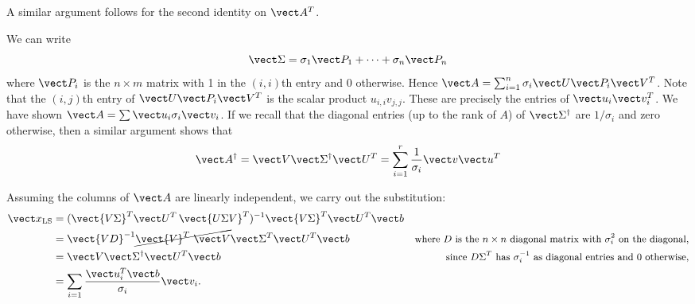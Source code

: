\documentclass{homework}
\begin{document}
\begin{longproblem}
\begin{solution}
    A similar argument follows for the second identity on $\vect A^T$.
  \end{solution}

  \begin{solution}
    We can write
    $$
      \vect\Sigma = \sigma_1 \vect P_1 + \dots + \sigma_n \vect P_n
    $$
    where $\vect P_i$ is the $n\times m$ matrix with 1 in the $(i,i)$th entry and 0 otherwise.  Hence $\vect A = \sum_{i=1}^n\sigma_i\vect U\vect P_i \vect V^T$. Note that the $(i,j)$th entry of 
    $\vect U\vect P_i\vect V^T$ is the scalar product $u_{i,i} v_{j,j}$.  These are precisely the entries of $\vect u_i \vect v_i^T$. We have shown $\vect A = \sum \vect u_i \sigma_i \vect v_i$.  If we recall that the diagonal entries (up to the rank of $A$) of $\vect \Sigma^\dagger$ are $1/\sigma_i$ and zero otherwise, then a similar argument shows that
    $$
      \vect A^\dagger = \vect V \vect \Sigma^\dagger \vect U^T = \sum_{i=1}^{r} \frac 1{\sigma_i}\vect v \vect u^T
    $$
  \end{solution}

\end{longproblem}
\begin{solution}
  Assuming the columns of $\vect A$ are linearly independent, we carry out the substitution:
  \begin{align*}
  \vect x_{\mathrm{LS}} &= (\vect {V\Sigma}^T \vect U^T \,\vect{U\Sigma V}^T)^{-1} \vect {V\Sigma}^T \vect U^T\vect b\\
  &= \vect {VD}^{-1} \cancel{\vect{ V}^T \,\, \vect V}\vect \Sigma^T \vect U^T\vect b &\text{\small where $D$ is the $n\times n$ diagonal matrix with $\sigma_i^2$ on the diagonal,}\\
  &= \vect V \vect \Sigma^\dagger \vect U^T\vect b &\text{\small since $D \Sigma^T$ has $\sigma_i^{-1}$ as diagonal entries and $0$ otherwise,} \\
  &= \sum_{i=1} \frac{\vect u_i^T \vect b}{\sigma_i}\vect v_i.
  \end{align*}
\end{solution}
\end{document}
